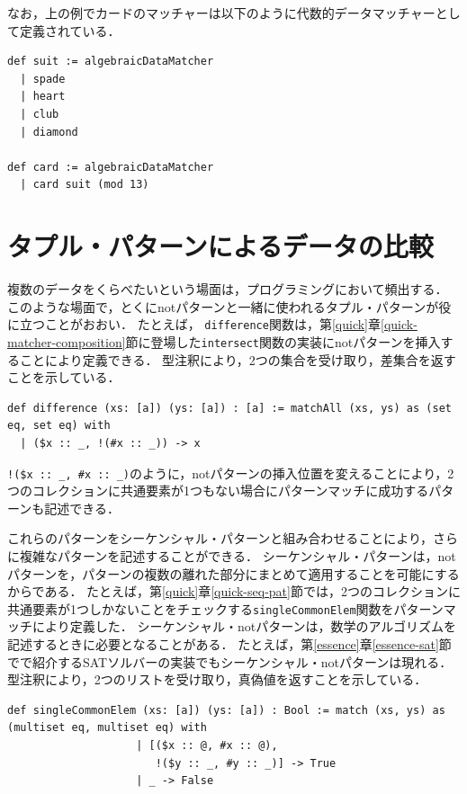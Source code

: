 なお，上の例でカードのマッチャーは以下のように代数的データマッチャーとして定義されている．
\begin{lstlisting}[language=egison,numbers=none]
def suit := algebraicDataMatcher
  | spade
  | heart
  | club
  | diamond

def card := algebraicDataMatcher
  | card suit (mod 13)
\end{lstlisting}

\section{タプル・パターンによるデータの比較}\label{pmo-tuple}

複数のデータをくらべたいという場面は，プログラミングにおいて頻出する．
このような場面で，とくにnotパターンと一緒に使われるタプル・パターンが役に立つことがおおい．
たとえば， \lstinline{difference}関数は，第\ref{quick}章\ref{quick-matcher-composition}節に登場した\lstinline{intersect}関数の実装にnotパターンを挿入することにより定義できる．
型注釈により，2つの集合を受け取り，差集合を返すことを示している．
\begin{lstlisting}[language=egison,numbers=none]
def difference (xs: [a]) (ys: [a]) : [a] := matchAll (xs, ys) as (set eq, set eq) with
  | ($x :: _, !(#x :: _)) -> x
\end{lstlisting}
\lstinline|!($x :: _, #x :: _)|のように，notパターンの挿入位置を変えることにより，2つのコレクションに共通要素が1つもない場合にパターンマッチに成功するパターンも記述できる．

これらのパターンをシーケンシャル・パターンと組み合わせることにより，さらに複雑なパターンを記述することができる．
シーケンシャル・パターンは，notパターンを，パターンの複数の離れた部分にまとめて適用することを可能にするからである．
たとえば，第\ref{quick}章\ref{quick-seq-pat}節では，2つのコレクションに共通要素が1つしかないことをチェックする\lstinline{singleCommonElem}関数をパターンマッチにより定義した．
シーケンシャル・notパターンは，数学のアルゴリズムを記述するときに必要となることがある．
たとえば，第\ref{essence}章\ref{essence-sat}節でで紹介するSATソルバーの実装でもシーケンシャル・notパターンは現れる．
型注釈により，2つのリストを受け取り，真偽値を返すことを示している．
\begin{lstlisting}[language=egison,numbers=none]
def singleCommonElem (xs: [a]) (ys: [a]) : Bool := match (xs, ys) as (multiset eq, multiset eq) with
                    | [($x :: @, #x :: @),
                       !($y :: _, #y :: _)] -> True
                    | _ -> False
\end{lstlisting}

